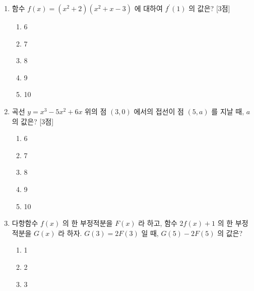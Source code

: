 \documentclass[10.5pt]{article}
\begin{document}
\begin{multicols}{2}
\begin{enumerate}
\begin{minipage}[t]{\linewidth}
\begin{enumerate}[label={\textcircled{\arabic*}}, itemsep=0.2em, topsep=0.2em, leftmargin=*, align=left]
\end{enumerate}
\par\vspace{12\baselineskip}
\end{minipage}
\item \leavevmode\begin{minipage}[t]{\linewidth}
함수 $f(x)=\left(x^{2}+2\right)\left(x^{2}+x-3\right)$ 에 대하여 $f^{\prime}(1)$ 의 값은? [3점]
\vspace{0.5em}
\begin{enumerate}[label={\textcircled{\arabic*}}, itemsep=0.2em, topsep=0.2em, leftmargin=*, align=left]
\item 6
\item 7
\item 8
\item 9
\item 10
\end{enumerate}
\par\vspace{12\baselineskip}
\end{minipage}
\item \leavevmode\begin{minipage}[t]{\linewidth}
곡선 $y=x^{3}-5 x^{2}+6 x$ 위의 점 $(3,0)$ 에서의 접선이 점 $(5, a)$ 를 지날 때, $a$ 의 값은? [3점]
\vspace{0.5em}
\begin{enumerate}[label={\textcircled{\arabic*}}, itemsep=0.2em, topsep=0.2em, leftmargin=*, align=left]
\item 6
\item 7
\item 8
\item 9
\item 10
\end{enumerate}
\par\vspace{12\baselineskip}
\end{minipage}
\item \leavevmode\begin{minipage}[t]{\linewidth}
다항함수 $f(x)$ 의 한 부정적분을 $F(x)$ 라 하고, 함수 $2 f(x)+1$ 의 한 부정적분을 $G(x)$ 라 하자. $G(3)=2 F(3)$ 일 때, $G(5)-2 F(5)$ 의 값은?
\vspace{0.5em}
\begin{enumerate}[label={\textcircled{\arabic*}}, itemsep=0.2em, topsep=0.2em, leftmargin=*, align=left]
\item 1
\item 2
\item 3

\end{enumerate}
\end{minipage}
\end{enumerate}
\end{multicols}
\end{document}
